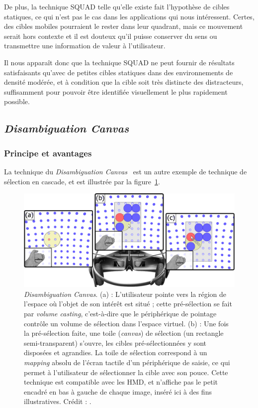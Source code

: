 	De plus, la technique SQUAD telle qu'elle existe fait l'hypothèse de cibles statiques, ce qui n'est pas le cas dans les applications qui nous intéressent. Certes, des cibles mobiles pourraient le rester dans leur quadrant, mais ce mouvement serait hors contexte et il est douteux qu'il puisse conserver du sens ou transmettre une information de valeur à l'utilisateur.
	
	Il nous apparaît donc que la technique SQUAD ne peut fournir de résultats satisfaisants qu'avec de petites cibles statiques dans des environnements de densité modérée, et à condition que la cible soit très distincte des distracteurs, suffisamment pour pouvoir être identifiée visuellement le plus rapidement possible.
	
	\subsection{\emph{Disambiguation Canvas}}
	\subsubsection{Principe et avantages}
	La technique du \emph{Disambiguation Canvas}~\cite{debarba2013disambiguation} est un autre exemple de technique de sélection en cascade, et est illustrée par la figure~\ref{fig:dCanvas}.
		 
	\begin{figure}[!htb]
		\centering
		\includegraphics[width=\textwidth]{figures/ch2/dCanvas}
		\caption[\emph{Disambiguation Canvas}]{\emph{Disambiguation Canvas}. (a) : L'utilisateur pointe vers la région de l'espace où l'objet de son intérêt est situé ; cette pré-sélection se fait par \emph{volume casting}, c'est-à-dire que le périphérique de pointage contrôle un volume de sélection dans l'espace virtuel. (b) : Une fois la pré-sélection faite, une \og toile \fg{} (\emph{canvas}) de sélection (un rectangle semi-transparent) s'ouvre, les cibles pré-sélectionnées y sont disposées et agrandies. La toile de sélection correspond à un \emph{mapping} absolu de l'écran tactile d'un périphérique de saisie, ce qui permet à l'utilisateur de sélectionner la cible avec son pouce. Cette technique est compatible avec les HMD, et n'affiche pas le petit encadré en bas à gauche de chaque image, inséré ici à des fins illustratives. Crédit : \cite{debarba2013disambiguation}.}
		\label{fig:dCanvas}
	\end{figure}
	
